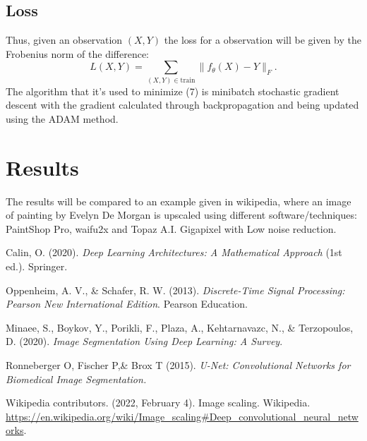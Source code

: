 \documentclass{article}
\theoremstyle{definition}
\begin{document}
\subsection{Loss}
Thus, given an observation $(X,Y)$ the loss for a observation will be given by the Frobenius norm  of the difference:
\begin{equation}
L(X,Y) = \sum_{(X,Y)\in\mbox{train}}\|f_\theta(X)-Y\|_{F}.
\end{equation}  
The algorithm that it's used to minimize (7) is minibatch stochastic gradient descent with the gradient calculated through backpropagation and being updated using the ADAM method. 

\section{Results}
The results will be compared to an example given in wikipedia\cite{Wiki}, where an image of painting by Evelyn De Morgan is upscaled using different software/techniques: PaintShop Pro,  waifu2x and Topaz A.I. Gigapixel with Low noise reduction.
\begin{thebibliography}{9}

Calin, O. (2020). \textit{Deep Learning Architectures: A Mathematical Approach}  (1st ed.). Springer.

Oppenheim, A. V., \& Schafer, R. W. (2013). \textit{Discrete-Time Signal Processing: Pearson New International Edition}. Pearson Education.

Minaee, S., Boykov, Y., Porikli, F., Plaza, A., Kehtarnavazc, N., \& Terzopoulos, D. (2020). \textit{Image Segmentation Using Deep Learning: A Survey}.

Ronneberger O, Fischer P,\& Brox T (2015). \textit{U-Net: Convolutional Networks for Biomedical Image Segmentation.}

Wikipedia contributors. (2022, February 4). Image scaling. Wikipedia. \url{https://en.wikipedia.org/wiki/Image_scaling#Deep_convolutional_neural_networks}.
\end{thebibliography}
\pagebreak
\end{document}
